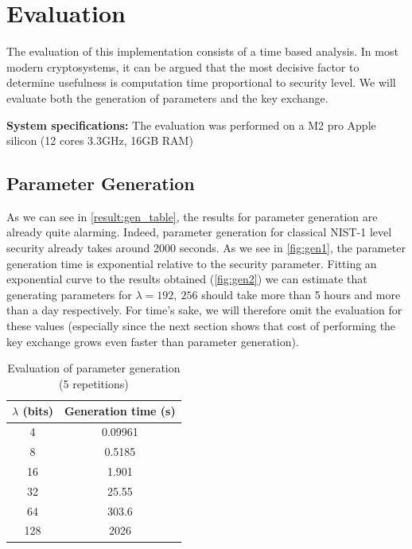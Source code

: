 \documentclass[a4paper,11pt,oneside]{report}
\begin{document}
\chapter{Evaluation}

The evaluation of this implementation consists of a time based analysis. In most modern cryptosystems, it can be argued that the most decisive factor to determine usefulness is computation time proportional to security level. We will evaluate both the generation of parameters and the key exchange. 

\textbf{System specifications:} The evaluation was performed on a M2 pro Apple silicon (12 cores 3.3GHz, 16GB RAM)


\section{Parameter Generation}

    As we can see in \autoref{result:gen_table}, the results for parameter generation are already quite alarming. Indeed, parameter generation for classical NIST-1 level security already takes around 2000 seconds. As we see in \autoref{fig:gen1}, the parameter generation time is exponential relative to the security parameter. Fitting an exponential curve to the results obtained (\autoref{fig:gen2}) we can estimate that generating parameters for $\lambda = 192,\:256$ should take more than 5 hours and more than a day respectively. For time's sake, we will therefore omit the evaluation for these values (especially since the next section shows that cost of performing the key exchange grows even faster than parameter generation).
    
    \begin{table}[!h]
        \label{result:gen_table}
        \begin{center}
        \begin{tabular}{| c | c |}
        \hline
        \textbf{$\lambda$ (bits)} & \textbf{Generation time (s)}  \\ 
        \hline

        4 & 0.09961 \\ \hline
        8 & 0.5185 \\ \hline
        16 & 1.901 \\ \hline
        32 & 25.55 \\ \hline
        64 & 303.6 \\ \hline
        128 & 2026 \\ \hline
        \hline
        \end{tabular}
        \end{center}
        \caption{Evaluation of parameter generation (5 repetitions)}
    \end{table}
\end{document}
